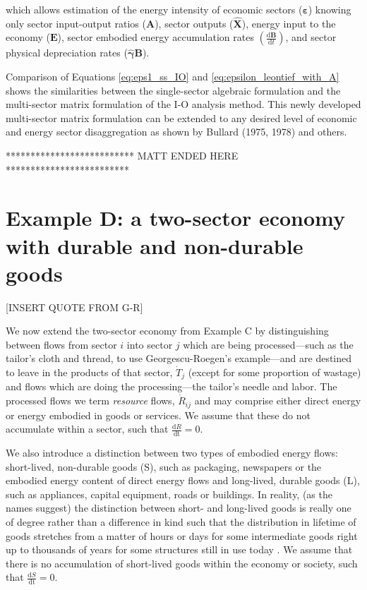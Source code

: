 \documentclass[authoryear,preprint,review,12pt]{elsarticle}
\let\oldhat\hat
\renewcommand{\vec}[1]{\mathbf{#1}}
\renewcommand{\hat}[1]{\oldhat{\mathbf{#1}}}
\begin{document}
\noindent which allows estimation of the energy intensity of economic sectors ($\vec{\varepsilon}$) knowing only sector input-output ratios ($\vec{A}$), sector outputs ($\hat{\vec{X}}$), energy input to the economy ($\vec{E}$), sector embodied energy accumulation rates $\left(\frac{\mathrm{d}\vec{B}}{\mathrm{d}t}\right)$, and sector physical depreciation rates ($\hat{\vec{\gamma}}\vec{B}$).

Comparison of Equations \ref{eq:eps1_ss_IO} and \ref{eq:epsilon_leontief_with_A} shows the similarities between the single-sector algebraic formulation and the multi-sector matrix formulation of the I-O analysis method. This newly developed multi-sector matrix formulation can be extended to any desired level of economic and energy sector disaggregation as shown by Bullard (1975, 1978) and others.

************************** MATT ENDED HERE *************************

\section{Example D: a two-sector economy with durable and non-durable goods}

[INSERT QUOTE FROM G-R]

We now extend the two-sector economy from Example C by distinguishing between flows from sector $i$ into sector $j$ which are being processed---such as the tailor's cloth and thread, to use Georgescu-Roegen's example---and are destined to leave in the products of that sector, $\dot{T}_{j}$ (except for some proportion of wastage) and flows which are doing the processing---the tailor's needle and labor. The processed flows we term \emph{resource} flows, $\dot{R}_{ij}$ and may comprise either direct energy or energy embodied in goods or services. We assume that these do not accumulate within a sector, such that $\frac{\textrm{d}R}{\textrm{dt}} = 0$.

We also introduce a distinction between two types of embodied energy flows: short-lived, non-durable goods (S), such as packaging, newspapers or the embodied energy content of direct energy flows and long-lived, durable goods (L), such as appliances, capital equipment, roads or buildings. In reality, (as the names suggest) the distinction between short- and long-lived goods is really one of degree rather than a difference in kind such that the distribution in lifetime of goods stretches from a matter of hours or days for some intermediate goods right up to thousands of years for some structures still in use today \cite{Leask2012}. We assume that there is no accumulation of short-lived goods within the economy or society, such that $\frac{\textrm{d}S}{\textrm{dt}} = 0$.  
\end{document}

